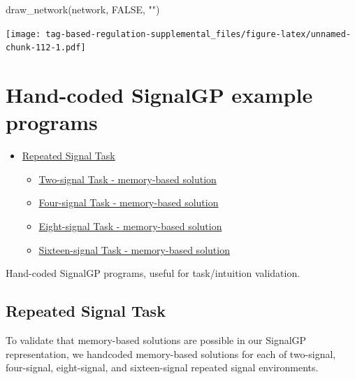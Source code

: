 \documentclass[
]{book}
\newenvironment{Shaded}{\begin{snugshade}}{\end{snugshade}}
\newcommand{\ConstantTok}[1]{\textcolor[rgb]{0.00,0.00,0.00}{#1}}
\newcommand{\FunctionTok}[1]{\textcolor[rgb]{0.00,0.00,0.00}{#1}}
\newcommand{\NormalTok}[1]{#1}
\newcommand{\StringTok}[1]{\textcolor[rgb]{0.31,0.60,0.02}{#1}}
\providecommand{\tightlist}{%
  \setlength{\itemsep}{0pt}\setlength{\parskip}{0pt}}
\begin{document}
\begin{Shaded}
\begin{Highlighting}[]
\FunctionTok{draw\_network}\NormalTok{(network, }\ConstantTok{FALSE}\NormalTok{, }\StringTok{""}\NormalTok{)}
\end{Highlighting}
\end{Shaded}

\texttt{[image: tag-based-regulation-supplemental\_files/figure-latex/unnamed-chunk-112-1.pdf]}

\hypertarget{hand-coded-signalgp-example-programs}{%
\chapter{Hand-coded SignalGP example programs}\label{hand-coded-signalgp-example-programs}}

\begin{itemize}
\tightlist
\item
  \protect\hyperlink{repeated-signal-task}{Repeated Signal Task}

  \begin{itemize}
  \tightlist
  \item
    \protect\hyperlink{two-signal-task---memory-based-solution}{Two-signal Task - memory-based solution}
  \item
    \protect\hyperlink{four-signal-task---memory-based-solution}{Four-signal Task - memory-based solution}
  \item
    \protect\hyperlink{eight-signal-task---memory-based-solution}{Eight-signal Task - memory-based solution}
  \item
    \protect\hyperlink{sixteen-signal-task---memory-based-solution}{Sixteen-signal Task - memory-based solution}
  \end{itemize}
\end{itemize}

Hand-coded SignalGP programs, useful for task/intuition validation.

\hypertarget{repeated-signal-task}{%
\section{Repeated Signal Task}\label{repeated-signal-task}}

To validate that memory-based solutions are possible in our SignalGP representation, we handcoded memory-based
solutions for each of two-signal, four-signal, eight-signal, and sixteen-signal repeated signal environments.
\end{document}
